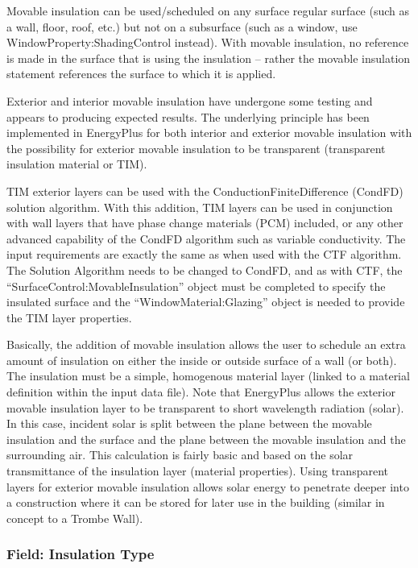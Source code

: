 Movable insulation can be used/scheduled on any surface regular surface (such as a wall, floor, roof, etc.) but not on a subsurface (such as a window, use WindowProperty:ShadingControl instead). With movable insulation, no reference is made in the surface that is using the insulation -- rather the movable insulation statement references the surface to which it is applied.

Exterior and interior movable insulation have undergone some testing and appears to producing expected results. The underlying principle has been implemented in EnergyPlus for both interior and exterior movable insulation with the possibility for exterior movable insulation to be transparent (transparent insulation material or TIM).

TIM exterior layers can be used with the ConductionFiniteDifference (CondFD) solution algorithm. With this addition, TIM layers can be used in conjunction with wall layers that have phase change materials (PCM) included, or any other advanced capability of the CondFD algorithm such as variable conductivity. The input requirements are exactly the same as when used with the CTF algorithm. The Solution Algorithm needs to be changed to CondFD, and as with CTF, the ``SurfaceControl:MovableInsulation'' object must be completed to specify the insulated surface and the ``WindowMaterial:Glazing'' object is needed to provide the TIM layer properties.

Basically, the addition of movable insulation allows the user to schedule an extra amount of insulation on either the inside or outside surface of a wall (or both). The insulation must be a simple, homogenous material layer (linked to a material definition within the input data file). Note that EnergyPlus allows the exterior movable insulation layer to be transparent to short wavelength radiation (solar). In this case, incident solar is split between the plane between the movable insulation and the surface and the plane between the movable insulation and the surrounding air. This calculation is fairly basic and based on the solar transmittance of the insulation layer (material properties). Using transparent layers for exterior movable insulation allows solar energy to penetrate deeper into a construction where it can be stored for later use in the building (similar in concept to a Trombe Wall).

\subsubsection{Field: Insulation Type}\label{field-insulation-type}

